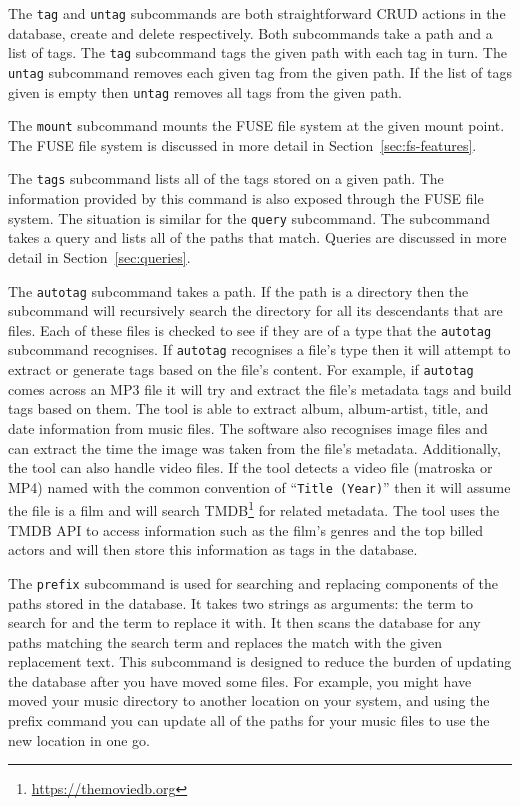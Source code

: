 The \texttt{tag} and \texttt{untag} subcommands are both straightforward CRUD
actions in the database, create and delete respectively. Both subcommands take
a path and a list of tags. The \texttt{tag} subcommand tags the given path with
each tag in turn. The \texttt{untag} subcommand removes each given tag from the
given path. If the list of tags given is empty then \texttt{untag} removes all
tags from the given path.

The \texttt{mount} subcommand mounts the FUSE file system at the given mount
point. The FUSE file system is discussed in more detail in
Section~\ref{sec:fs-features}.

The \texttt{tags} subcommand lists all of the tags stored on a given path. The
information provided by this command is also exposed through the FUSE file
system. The situation is similar for the \texttt{query} subcommand. The
subcommand takes a query and lists all of the paths that match. Queries are
discussed in more detail in Section~\ref{sec:queries}.

The \texttt{autotag} subcommand takes a path. If the path is a directory then
the subcommand will recursively search the directory for all its descendants
that are files. Each of these files is checked to see if they are of a type
that the \texttt{autotag} subcommand recognises. If \texttt{autotag} recognises
a file's type then it will attempt to extract or generate tags based on the
file's content. For example, if \texttt{autotag} comes across an MP3 file it
will try and extract the file's metadata tags and build tags based on them. The
tool is able to extract album, album-artist, title, and date information from
music files. The software also recognises image files and can extract the time
the image was taken from the file's metadata. Additionally, the tool can also
handle video files. If the tool detects a video file (matroska or MP4) named
with the common convention of ``\texttt{Title (Year)}'' then it will assume the
file is a film and will search TMDB\footnote{\url{https://themoviedb.org}} for
related metadata. The tool uses the TMDB API to access information such as the
film's genres and the top billed actors and will then store this information as
tags in the database.

The \texttt{prefix} subcommand is used for searching and replacing components
of the paths stored in the database. It takes two strings as arguments: the
term to search for and the term to replace it with. It then scans the database
for any paths matching the search term and replaces the match with the given
replacement text. This subcommand is designed to reduce the burden of updating
the database after you have moved some files. For example, you might have moved
your music directory to another location on your system, and using the prefix
command you can update all of the paths for your music files to use the new
location in one go.

